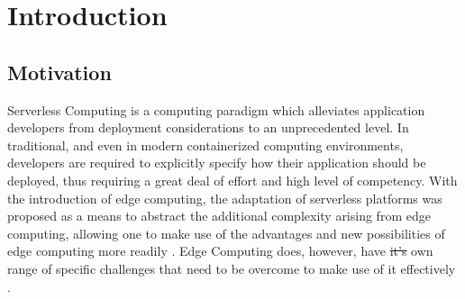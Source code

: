 \documentclass[draft,final]{vutinfth} %
\providecommand{\DIFaddtex}[1]{{\protect\color{blue}\uwave{#1}}} %
\providecommand{\DIFdeltex}[1]{{\protect\color{red}\sout{#1}}}                      %
\providecommand{\DIFaddbegin}{} %
\providecommand{\DIFaddend}{} %
\providecommand{\DIFdelbegin}{} %
\providecommand{\DIFdelend}{} %
\providecommand{\DIFadd}[1]{\texorpdfstring{\DIFaddtex{#1}}{#1}} %
\providecommand{\DIFdel}[1]{\texorpdfstring{\DIFdeltex{#1}}{}} %
\begin{document}

\tableofcontents %

\mainmatter
{}
\DIFaddbegin {}
\DIFaddend 

\chapter{Introduction}
\section{Motivation}
Serverless Computing is a computing paradigm which alleviates application developers from deployment considerations to an unprecedented level. %
In traditional, and even in modern containerized computing environments, developers are required to explicitly specify how their application should be deployed, thus requiring a great deal of effort and high level of competency. %
With the introduction of edge computing, the adaptation of serverless platforms was proposed as a means to abstract the additional complexity arising from edge computing, allowing one to make use of the advantages and new possibilities of edge computing more readily \cite{nasticServerlessRealTimeData2017}\cite{gliksonDevicelessEdgeComputing2017}.
Edge Computing does, however, have \DIFdelbegin \DIFdel{it's }\DIFdelend \DIFaddbegin \DIFadd{its }\DIFaddend own range of specific challenges that need to be overcome to make use of it effectively \cite{shiEdgeComputingVisionChallenges2016}.
\end{document}
